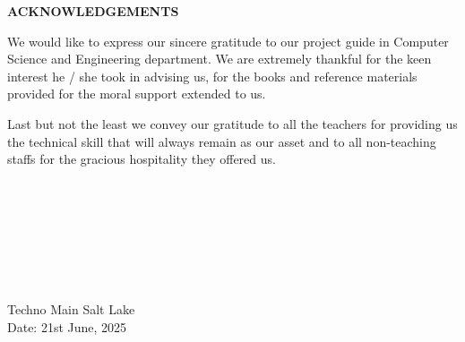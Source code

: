 
\thispagestyle{plain}

\vspace*{\fill} %

\begin{center}
    \LARGE {\bf \uppercase{Acknowledgements}}
   \end{center}
   
   \vspace{0.5\baselineskip}
   
   \noindent
   We would like to express our sincere gratitude to our project guide in Computer Science and Engineering department. We are extremely thankful for the keen interest he / she took in advising us, for the books and reference materials provided for the moral support extended to us.
   
   
   \vspace{\baselineskip}
   \noindent
   Last but not the least we convey our gratitude to all the teachers for providing us the technical skill that will always remain as our asset and to all non-teaching staffs for the gracious hospitality they offered us.

\vspace{-0.5cm}


\hspace{1.0\baselineskip}

\begin{flushright}

\vspace{2\baselineskip}
\makebox[7cm]{\dotfill} \\
\textls[90]{\textbf{\mynameone ~(\myrollnoone)}}

\vspace{2.5\baselineskip}
\makebox[7cm]{\dotfill} \\
\textls[90]{\textbf{\mynametwo ~(\myrollnotwo)}}

\vspace{2.5\baselineskip}
\makebox[7cm]{\dotfill} \\
\textls[90]{\textbf{\mynamethree ~(\myrollnothree)}}

\vspace{2.5\baselineskip}
\makebox[7cm]{\dotfill} \\
\textls[90]{\textbf{\mynamefour ~(\myrollnofour)}}

\end{flushright}



\noindent
Techno Main Salt Lake \\
Date: 21st June, 2025

\vspace*{\fill} %